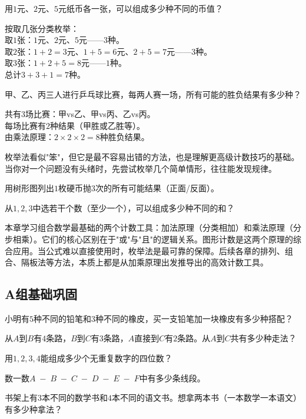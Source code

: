 \begin{example}
用$1$元、$2$元、$5$元纸币各一张，可以组成多少种不同的币值？
\end{example}
\begin{solution}
按取几张分类枚举：\\
取$1$张：$1$元、$2$元、$5$元——$3$种。\\
取$2$张：$1+2=3$元、$1+5=6$元、$2+5=7$元——$3$种。\\
取$3$张：$1+2+5=8$元——$1$种。\\
总计$3+3+1=7$种。
\end{solution}

\begin{example}
甲、乙、丙三人进行乒乓球比赛，每两人赛一场，所有可能的胜负结果有多少种？
\end{example}
\begin{solution}
共有$3$场比赛：甲vs乙、甲vs丙、乙vs丙。\\
每场比赛有$2$种结果（甲胜或乙胜等）。\\
由乘法原理：$2\times2\times2=8$种胜负结果。
\end{solution}

枚举法看似"笨"，但它是最不容易出错的方法，也是理解更高级计数技巧的基础。当你对一个问题没有头绪时，先尝试枚举几个简单情形，往往能发现规律。

\begin{exercise}
\item 用树形图列出$1$枚硬币抛$3$次的所有可能结果（正面/反面）。
\item 从$1,2,3$中选若干个数（至少一个），可以组成多少种不同的和？
\end{exercise}


本章学习组合数学最基础的两个计数工具：加法原理（分类相加）和乘法原理（分步相乘）。它们的核心区别在于"或"与"且"的逻辑关系。图形计数是这两个原理的综合应用。当公式难以直接使用时，枚举法是最可靠的保障。后续各章的排列、组合、隔板法等方法，本质上都是从加乘原理出发推导出的高效计数工具。


\subsection*{A组\quad 基础巩固}

\begin{exercise}
\item 小明有$5$种不同的铅笔和$3$种不同的橡皮，买一支铅笔加一块橡皮有多少种搭配？
\item 从$A$到$B$有$4$条路，$B$到$C$有$3$条路，$A$直接到$C$有$2$条路。从$A$到$C$共有多少种走法？
\item 用$1,2,3,4$能组成多少个无重复数字的四位数？
\item 数一数$A\;-\;B\;-\;C\;-\;D\;-\;E\;-\;F$中有多少条线段。
\item 书架上有$3$本不同的数学书和$4$本不同的语文书。想拿两本书（一本数学一本语文）有多少种拿法？
\end{exercise}

